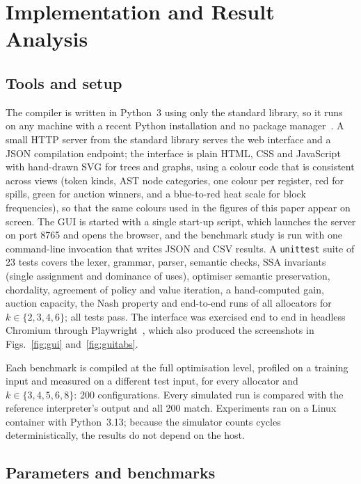 \documentclass[conference]{IEEEtran}
\begin{document}
\section{Implementation and Result Analysis}
\label{sec:impl}

\subsection{Tools and setup}

The compiler is written in Python~3 using only the standard library, so
it runs on any machine with a recent Python installation and no package
manager~\cite{python}. A small HTTP server from the standard library
serves the web interface and a JSON compilation endpoint; the interface
is plain HTML, CSS and JavaScript with hand-drawn SVG for trees and
graphs, using a colour code that is consistent across views (token
kinds, AST node categories, one colour per register, red for spills,
green for auction winners, and a blue-to-red heat scale for block
frequencies), so that the same colours used in the figures of this
paper appear on screen. The GUI
is started with a single start-up script, which launches the server on
port 8765 and opens the browser, and the benchmark study is run with one
command-line invocation that writes JSON and CSV results. A
\texttt{unittest} suite of 23 tests covers the lexer, grammar, parser,
semantic checks, SSA invariants (single assignment and dominance of
uses), optimiser semantic preservation, chordality, agreement of policy
and value iteration, a hand-computed gain, auction capacity, the Nash
property and end-to-end runs of all allocators for $k\in\{2,3,4,6\}$;
all tests pass. The interface was exercised end to end in headless
Chromium through Playwright~\cite{playwright}, which also produced the
screenshots in Figs.~\ref{fig:gui} and~\ref{fig:guitabs}.

Each benchmark is compiled at the full optimisation level, profiled on
a training input and measured on a different test input, for every
allocator and $k\in\{3,4,5,6,8\}$: 200 configurations. Every simulated
run is compared with the reference interpreter's output and all 200
match. Experiments ran on a Linux container with Python~3.13; because
the simulator counts cycles deterministically, the results do not
depend on the host.





\subsection{Parameters and benchmarks}
\end{document}
